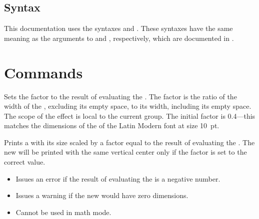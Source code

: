 \documentclass{beery}
\begin{document}
\subsection{Syntax}
\label{subsec:syntax}

This documentation uses the syntaxes  and .
These syntaxes have the same meaning as the arguments to  and , respectively, which are documented in .


\section{Commands}
\label{sec:commands}

\begin{function}{\settextbulletfactor}
  \begin{syntax}
  \end{syntax}
  Sets the  factor to the result of evaluating the .
  The  factor is the ratio of the width of the , excluding its empty space, to its width, including its empty space.
  The scope of the effect is local to the current group.
  The initial  factor is \num{0.4}---this matches the dimensions of the  of the Latin Modern font at size \qty{10}{pt}.
\end{function}

\begin{function}{\scaletextbullet}
  \begin{syntax}
  \end{syntax}
  Prints a  with its size scaled by a factor equal to the result of evaluating the .
  The new  will be printed with the same vertical center only if the  factor is set to the correct value.

  \begin{itemize}
    \item
    Issues an error if the result of evaluating the  is a negative number.
    \item
    Issues a warning if the new  would have zero dimensions.
    \item
    Cannot be used in math mode.
  \end{itemize}
\end{function}
\end{document}
